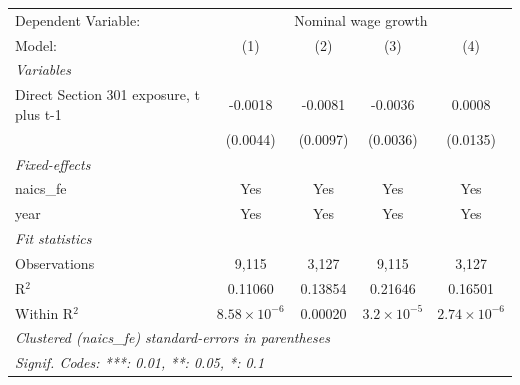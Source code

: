 \begingroup
\centering
\begin{tabular}{lcccc}
   \tabularnewline \midrule \midrule
   Dependent Variable: & \multicolumn{4}{c}{Nominal wage growth}\\
   Model:                                  & (1)                   & (2)      & (3)                  & (4)\\  
   \midrule
   \emph{Variables}\\
   Direct Section 301 exposure, t plus t-1 & -0.0018               & -0.0081  & -0.0036              & 0.0008\\   
                                           & (0.0044)              & (0.0097) & (0.0036)             & (0.0135)\\   
   \midrule
   \emph{Fixed-effects}\\
   naics\_fe                               & Yes                   & Yes      & Yes                  & Yes\\  
   year                                    & Yes                   & Yes      & Yes                  & Yes\\  
   \midrule
   \emph{Fit statistics}\\
   Observations                            & 9,115                 & 3,127    & 9,115                & 3,127\\  
   R$^2$                                   & 0.11060               & 0.13854  & 0.21646              & 0.16501\\  
   Within R$^2$                            & $8.58\times 10^{-6}$  & 0.00020  & $3.2\times 10^{-5}$  & $2.74\times 10^{-6}$\\   
   \midrule \midrule
   \multicolumn{5}{l}{\emph{Clustered (naics\_fe) standard-errors in parentheses}}\\
   \multicolumn{5}{l}{\emph{Signif. Codes: ***: 0.01, **: 0.05, *: 0.1}}\\
\end{tabular}
\par\endgroup
